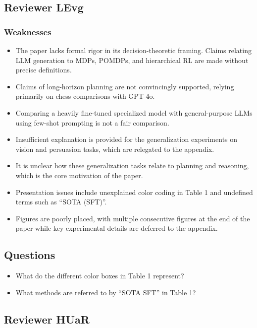 \documentclass{article}
\theoremstyle{plain}
\theoremstyle{definition}
\theoremstyle{remark}
\begin{document}
\subsection*{Reviewer LEvg}

\subsubsection*{Weaknesses}

\begin{itemize}
    \item The paper lacks formal rigor in its decision-theoretic framing. Claims relating LLM generation to MDPs, POMDPs, and hierarchical RL are made without precise definitions.
    \item Claims of long-horizon planning are not convincingly supported, relying primarily on chess comparisons with GPT-4o.
    \item Comparing a heavily fine-tuned specialized model with general-purpose LLMs using few-shot prompting is not a fair comparison.
    \item Insufficient explanation is provided for the generalization experiments on vision and persuasion tasks, which are relegated to the appendix.
    \item It is unclear how these generalization tasks relate to planning and reasoning, which is the core motivation of the paper.
    \item Presentation issues include unexplained color coding in Table 1 and undefined terms such as ``SOTA (SFT)''.
    \item Figures are poorly placed, with multiple consecutive figures at the end of the paper while key experimental details are deferred to the appendix.
\end{itemize}

\subsection*{Questions}

\begin{itemize}
    \item What do the different color boxes in Table 1 represent?
    \item What methods are referred to by ``SOTA SFT'' in Table 1?
\end{itemize}


\subsection*{Reviewer HUaR}
\end{document}
